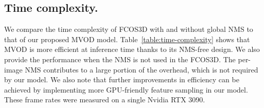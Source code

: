 \subsection*{Time complexity.}
We compare the time complexity of FCOS3D with and without global NMS to that of our proposed MVOD model. Table~\ref{table:time-complexity} shows that MVOD is more efficient at inference time thanks to its NMS-free design. We also provide the performance when the NMS is not used in the FCOS3D. The per-image NMS contributes to a large portion of the overhead, which is not required by our model. 
We also note that further improvements in efficiency can be achieved by implementing more GPU-friendly feature sampling in our model. These frame rates were measured on a single Nvidia RTX 3090.

\begin{table}[t] 
\begin{center}
\caption{Time complexity.\label{table:time-complexity}}
 \vspace{-1.5em}
\end{center}
\end{table}


